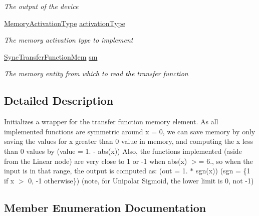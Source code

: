 \begin{DoxyCompactItemize}
\begin{DoxyCompactList}\small\item\em The output of the device \end{DoxyCompactList}\item 
\hyperlink{class_n_n_gen_1_1_transfer_function_wrapper_aa338ffadb8fcdf76df75419374a51ff6}{Memory\+Activation\+Type} \hyperlink{class_n_n_gen_1_1_transfer_function_wrapper_a6e15bcbf79f66a23f040cbcc69fec3d2}{activation\+Type}
\begin{DoxyCompactList}\small\item\em The memory activation type to implement \end{DoxyCompactList}\item 
\hyperlink{class_n_n_gen_1_1_sync_transfer_function_mem}{Sync\+Transfer\+Function\+Mem} \hyperlink{class_n_n_gen_1_1_transfer_function_wrapper_aecb111b0e3e39a4dec337da6288341f4}{sm}
\begin{DoxyCompactList}\small\item\em The memory entity from which to read the transfer function \end{DoxyCompactList}\end{DoxyCompactItemize}


\subsection{Detailed Description}
Initializes a wrapper for the transfer function memory element. As all implemented functions are symmetric around x = 0, we can save memory by only saving the values for x greater than 0 value in memory, and computing the x less than 0 values by (value = 1. -\/ abs(x)) Also, the functions implemented (aside from the Linear node) are very close to 1 or -\/1 when abs(x) $>$= 6., so when the input is in that range, the output is computed as\+: (out = 1. $\ast$ sgn(x)) (sgn = \{1 if x $>$ 0, -\/1 otherwise\}) (note, for Unipolar Sigmoid, the lower limit is 0, not -\/1) 



\subsection{Member Enumeration Documentation}
\hypertarget{class_n_n_gen_1_1_transfer_function_wrapper_aa338ffadb8fcdf76df75419374a51ff6}{}
